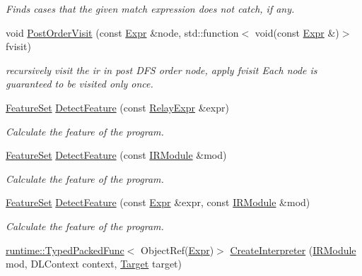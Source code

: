 \begin{DoxyCompactItemize}
\begin{DoxyCompactList}\small\item\em Finds cases that the given match expression does not catch, if any. \end{DoxyCompactList}\item 
void \hyperlink{namespacetvm_1_1relay_a5ede3d80c546097084cf98b60e600b80}{Post\+Order\+Visit} (const \hyperlink{namespacetvm_1_1relay_a5b84e3790f89bb3fad5c7911eeb99531}{Expr} \&node, std\+::function$<$ void(const \hyperlink{namespacetvm_1_1relay_a5b84e3790f89bb3fad5c7911eeb99531}{Expr} \&)$>$ fvisit)
\begin{DoxyCompactList}\small\item\em recursively visit the ir in post D\+FS order node, apply fvisit Each node is guaranteed to be visited only once. \end{DoxyCompactList}\item 
\hyperlink{classtvm_1_1relay_1_1FeatureSet}{Feature\+Set} \hyperlink{namespacetvm_1_1relay_a62b651084b386991221bc32c020cbef5}{Detect\+Feature} (const \hyperlink{classtvm_1_1RelayExpr}{Relay\+Expr} \&expr)
\begin{DoxyCompactList}\small\item\em Calculate the feature of the program. \end{DoxyCompactList}\item 
\hyperlink{classtvm_1_1relay_1_1FeatureSet}{Feature\+Set} \hyperlink{namespacetvm_1_1relay_a81978c82e1130854e575ccabc152ad70}{Detect\+Feature} (const \hyperlink{classtvm_1_1IRModule}{I\+R\+Module} \&mod)
\begin{DoxyCompactList}\small\item\em Calculate the feature of the program. \end{DoxyCompactList}\item 
\hyperlink{classtvm_1_1relay_1_1FeatureSet}{Feature\+Set} \hyperlink{namespacetvm_1_1relay_a191d5425083368521d49cc49cef65aba}{Detect\+Feature} (const \hyperlink{namespacetvm_1_1relay_a5b84e3790f89bb3fad5c7911eeb99531}{Expr} \&expr, const \hyperlink{classtvm_1_1IRModule}{I\+R\+Module} \&mod)
\begin{DoxyCompactList}\small\item\em Calculate the feature of the program. \end{DoxyCompactList}\item 
\hyperlink{classtvm_1_1runtime_1_1TypedPackedFunc}{runtime\+::\+Typed\+Packed\+Func}$<$ Object\+Ref(\hyperlink{namespacetvm_1_1relay_a5b84e3790f89bb3fad5c7911eeb99531}{Expr})$>$ \hyperlink{namespacetvm_1_1relay_ad02b5b16803fc28a9d920b105074a17d}{Create\+Interpreter} (\hyperlink{classtvm_1_1IRModule}{I\+R\+Module} mod, D\+L\+Context context, \hyperlink{classtvm_1_1Target}{Target} target)

\end{DoxyCompactItemize}

